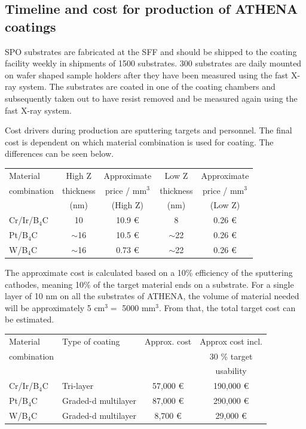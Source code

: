 \subsection{Timeline and cost for production of ATHENA coatings}
SPO substrates are fabricated at the SFF and should be shipped to the coating facility weekly in shipments of 1500 substrates. 300 substrates are daily mounted on wafer shaped sample holders after they have been measured using the fast X-ray system. The substrates are coated in one of the coating chambers and subsequently taken out to have resist removed and be measured again using the fast X-ray system.

Cost drivers during production are sputtering targets and personnel. The final cost is dependent on which material combination is used for coating. The differences can be seen below.

\begin{table}[htbp]
	\centering
\begin{tabular}{l|c|c|c|c}
Material 	& High Z 		& Approximate & Low Z  & Approximate \\
combination & thickness & price / mm$^3$ & thickness &  price / mm$^3$ \\
 & (nm) & (High Z) & (nm) &  (Low Z) \\
\hline
\hline
Cr/Ir/B$_4$C & 10 & 10.9 \euro & 8 & 0.26 \euro\\
\hline
Pt/B$_4$C & $\sim$16 & 10.5 \euro & $\sim$22 & 0.26 \euro\\
\hline
W/B$_4$C & $\sim$16 & 0.73 \euro & $\sim$22 & 0.26 \euro\\
\end{tabular}
\end{table}

The approximate cost is calculated based on a 10\% efficiency of the sputtering cathodes, meaning 10\% of the target material ends on a substrate. For a single layer of 10 nm on all the substrates of ATHENA, the volume of material needed will be approximately 5 cm$^3 = $ 5000 mm$^3$. From that, the total target cost can be estimated.

\begin{table}[htbp]
	\centering
\begin{tabular}{l|l|c|c}
Material 	& Type of coating & Approx. cost & Approx cost incl. \\
combination	&	&	&	30 \% target \\
&	&	&	usability\\
\hline
\hline
Cr/Ir/B$_4$C & Tri-layer & 57,000 \euro & 190,000 \euro \\
\hline
Pt/B$_4$C & Graded-d multilayer & 87,000 \euro & 290,000 \euro\\
\hline
W/B$_4$C & Graded-d multilayer & 8,700 \euro & 29,000 \euro \\
\end{tabular}
\end{table}

